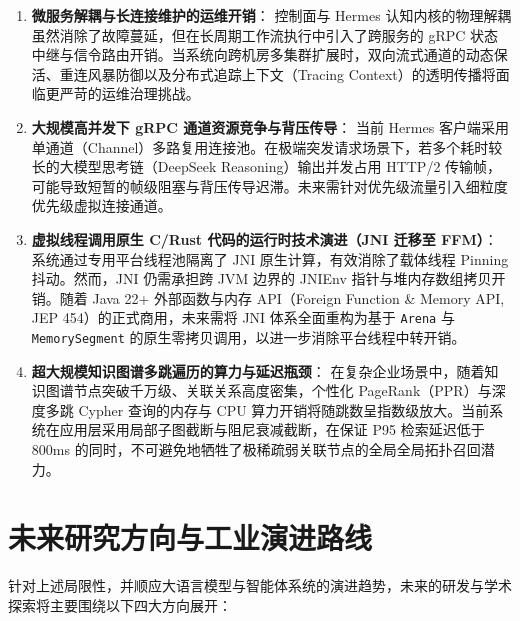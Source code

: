 \begin{enumerate}
    \item \textbf{微服务解耦与长连接维护的运维开销}：
    控制面与 Hermes 认知内核的物理解耦虽然消除了故障蔓延，但在长周期工作流执行中引入了跨服务的 gRPC 状态中继与信令路由开销。当系统向跨机房多集群扩展时，双向流式通道的动态保活、重连风暴防御以及分布式追踪上下文（Tracing Context）的透明传播将面临更严苛的运维治理挑战。

    \item \textbf{大规模高并发下 gRPC 通道资源竞争与背压传导}：
    当前 Hermes 客户端采用单通道（Channel）多路复用连接池。在极端突发请求场景下，若多个耗时较长的大模型思考链（DeepSeek Reasoning）输出并发占用 HTTP/2 传输帧，可能导致短暂的帧级阻塞与背压传导迟滞。未来需针对优先级流量引入细粒度优先级虚拟连接通道。

    \item \textbf{虚拟线程调用原生 C/Rust 代码的运行时技术演进（JNI 迁移至 FFM）}：
    系统通过专用平台线程池隔离了 JNI 原生计算，有效消除了载体线程 Pinning 抖动。然而，JNI 仍需承担跨 JVM 边界的 JNIEnv 指针与堆内存数组拷贝开销。随着 Java 22+ 外部函数与内存 API（Foreign Function \& Memory API, JEP 454）的正式商用，未来需将 JNI 体系全面重构为基于 \texttt{Arena} 与 \texttt{MemorySegment} 的原生零拷贝调用，以进一步消除平台线程中转开销。

    \item \textbf{超大规模知识图谱多跳遍历的算力与延迟瓶颈}：
    在复杂企业场景中，随着知识图谱节点突破千万级、关联关系高度密集，个性化 PageRank（PPR）与深度多跳 Cypher 查询的内存与 CPU 算力开销将随跳数呈指数级放大。当前系统在应用层采用局部子图截断与阻尼衰减截断，在保证 P95 检索延迟低于 800ms 的同时，不可避免地牺牲了极稀疏弱关联节点的全局全局拓扑召回潜力。
\end{enumerate}

\section{未来研究方向与工业演进路线}

针对上述局限性，并顺应大语言模型与智能体系统的演进趋势，未来的研发与学术探索将主要围绕以下四大方向展开：

